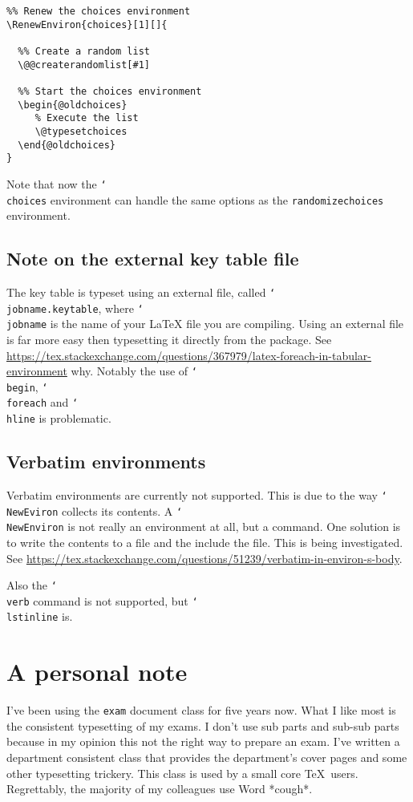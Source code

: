 \documentclass[12pt,a4paper]{exam}
\providecommand{\texorpdfstring}[2]{#1}
\newcommand{\bs}{\texorpdfstring{\char`\\}{}}
\begin{document}
\begin{lstlisting}
%% Renew the choices environment
\RenewEnviron{choices}[1][]{

  %% Create a random list
  \@@createrandomlist[#1]

  %% Start the choices environment
  \begin{@oldchoices}
     % Execute the list
     \@typesetchoices
  \end{@oldchoices}
}
\end{lstlisting}

Note that now the \texttt{\bs choices} environment can handle the same options as the
\texttt{randomizechoices} environment.

\subsection{Note on the external key table file}
The key table is typeset using an external file, called \texttt{\bs jobname.keytable},
where \texttt{\bs jobname} is the name of your \LaTeX{} file you are compiling. Using
an external file is far more easy then typesetting it directly from the package. See
\url{https://tex.stackexchange.com/questions/367979/latex-foreach-in-tabular-environment}
why. Notably the use of \texttt{\bs begin}, \texttt{\bs foreach} and \texttt{\bs hline}
is problematic.

\subsection{Verbatim environments}
Verbatim environments are currently not supported. This is due to the way \texttt{\bs NewEviron}
collects its contents. A \texttt{\bs NewEnviron} is not really an environment at all, but a
command. One solution is to write the contents to a file and the include the file. This is
being investigated. See \url{https://tex.stackexchange.com/questions/51239/verbatim-in-environ-s-body}.

Also the \texttt{\bs verb} command is not supported, but \texttt{\bs lstinline} is.

\section{A personal note}
I've been using the \texttt{exam} document class for five years now. What I like most
is the consistent typesetting of my exams. I don't use sub parts and sub-sub parts
because in my opinion this not the right way to prepare an exam. I've written a
department consistent class that provides the department's cover pages and some
other typesetting trickery. This class is used by a small core \TeX\ users. Regrettably,
the majority of my colleagues use Word *cough*.
\end{document}
